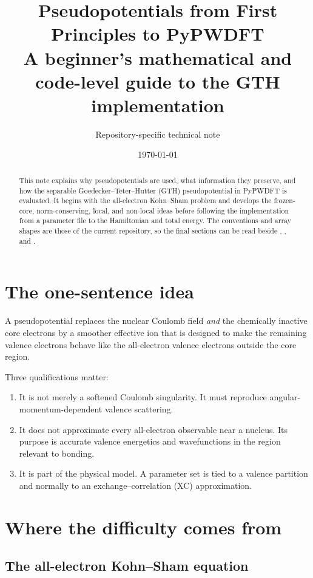 \documentclass[10pt,twocolumn]{article}
\title{\textbf{Pseudopotentials from First Principles to PyPWDFT}\\
\large A beginner's mathematical and code-level guide to the GTH implementation}
\author{Repository-specific technical note}
\date{\today}
\begin{document}
\maketitle

\begin{abstract}
This note explains why pseudopotentials are used, what information they
preserve, and how the separable Goedecker--Teter--Hutter (GTH)
pseudopotential in PyPWDFT is evaluated.  It begins with the all-electron
Kohn--Sham problem and develops the frozen-core, norm-conserving, local, and
non-local ideas before following the implementation from a parameter file to
the Hamiltonian and total energy.  The conventions and array shapes are those
of the current repository, so the final sections can be read beside
, , and
.
\end{abstract}

\section{The one-sentence idea}

A pseudopotential replaces the nuclear Coulomb field \emph{and} the chemically
inactive core electrons by a smoother effective ion that is designed to make
the remaining valence electrons behave like the all-electron valence
electrons outside the core region.

Three qualifications matter:
\begin{enumerate}
  \item It is not merely a softened Coulomb singularity.  It must reproduce
  angular-momentum-dependent valence scattering.
  \item It does not approximate every all-electron observable near a nucleus.
  Its purpose is accurate valence energetics and wavefunctions in the region
  relevant to bonding.
  \item It is part of the physical model.  A parameter set is tied to a
  valence partition and normally to an exchange--correlation (XC)
  approximation.
\end{enumerate}

\section{Where the difficulty comes from}

\subsection{The all-electron Kohn--Sham equation}
\end{document}
